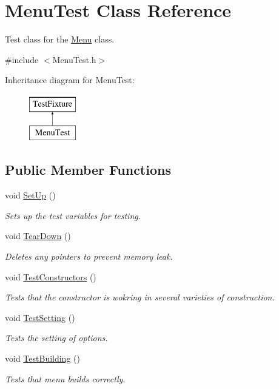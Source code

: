 \hypertarget{classMenuTest}{\section{Menu\-Test Class Reference}
\label{classMenuTest}
}


Test class for the \hyperlink{classMenu}{Menu} class.  




{\ttfamily \#include $<$Menu\-Test.\-h$>$}

Inheritance diagram for Menu\-Test\-:\begin{figure}[H]
\begin{center}
\leavevmode
\includegraphics[height=2.000000cm]{classMenuTest}
\end{center}
\end{figure}
\subsection*{Public Member Functions}
\begin{DoxyCompactItemize}
\item 
void \hyperlink{classMenuTest_afe356a4dfec90fec48cdfb5a31292dda}{Set\-Up} ()
\begin{DoxyCompactList}\small\item\em Sets up the test variables for testing. \end{DoxyCompactList}\item 
void \hyperlink{classMenuTest_abd39213e0c7d442794d552460d920865}{Tear\-Down} ()
\begin{DoxyCompactList}\small\item\em Deletes any pointers to prevent memory leak. \end{DoxyCompactList}\item 
void \hyperlink{classMenuTest_a8937223971935c31487f46a00d294e97}{Test\-Constructors} ()
\begin{DoxyCompactList}\small\item\em Tests that the constructor is wokring in several varieties of construction. \end{DoxyCompactList}\item 
void \hyperlink{classMenuTest_ab0a87d1e4ee856ccf3af3cc6663845c4}{Test\-Setting} ()
\begin{DoxyCompactList}\small\item\em Tests the setting of options. \end{DoxyCompactList}\item 
void \hyperlink{classMenuTest_af74ddfe672fb68438b3e966c3736a763}{Test\-Building} ()
\begin{DoxyCompactList}\small\item\em Tests that menu builds correctly. \end{DoxyCompactList}\end{DoxyCompactItemize}
